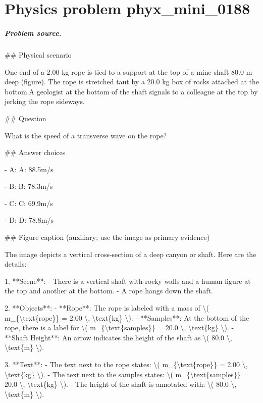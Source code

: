 
\chapter{Physics problem phyx\_mini\_0188}
\label{ch:PhyXMiniProblems_problem_phyx_mini_0188}

\paragraph{Problem source.}
\#\# Physical scenario

One end of a 2.00 kg rope is tied to a support at the top of a mine shaft 80.0 m deep (figure). The rope is stretched taut by a 20.0 kg box of rocks attached at the bottom.A geologist at the bottom of the shaft signals to a colleague at the top by jerking the rope sideways.

\#\# Question

What is the speed of a transverse wave on the rope?

\#\# Answer choices

- A: A: 88.5m/s

- B: B: 78.3m/s

- C: C: 69.9m/s

- D: D: 78.8m/s

\#\# Figure caption (auxiliary; use the image as primary evidence)

The image depicts a vertical cross-section of a deep canyon or shaft. Here are the details:

1. **Scene**: 
   - There is a vertical shaft with rocky walls and a human figure at the top and another at the bottom.
   - A rope hangs down the shaft.

2. **Objects**:
   - **Rope**: The rope is labeled with a mass of \textbackslash{}( m\_\{\textbackslash{}text\{rope\}\} = 2.00 \textbackslash{}, \textbackslash{}text\{kg\} \textbackslash{}).
   - **Samples**: At the bottom of the rope, there is a label for \textbackslash{}( m\_\{\textbackslash{}text\{samples\}\} = 20.0 \textbackslash{}, \textbackslash{}text\{kg\} \textbackslash{}).
   - **Shaft Height**: An arrow indicates the height of the shaft as \textbackslash{}( 80.0 \textbackslash{}, \textbackslash{}text\{m\} \textbackslash{}).

3. **Text**:
   - The text next to the rope states: \textbackslash{}( m\_\{\textbackslash{}text\{rope\}\} = 2.00 \textbackslash{}, \textbackslash{}text\{kg\} \textbackslash{}).
   - The text next to the samples states: \textbackslash{}( m\_\{\textbackslash{}text\{samples\}\} = 20.0 \textbackslash{}, \textbackslash{}text\{kg\} \textbackslash{}).
   - The height of the shaft is annotated with: \textbackslash{}( 80.0 \textbackslash{}, \textbackslash{}text\{m\} \textbackslash{}).

